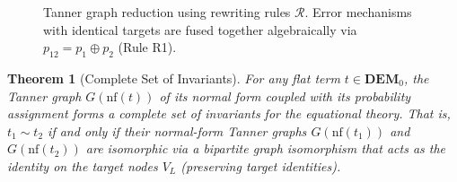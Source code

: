 \documentclass[11pt,a4paper]{article}
\newtheorem{theorem}{Theorem}
\newcommand{\nf}[1]{\mathrm{nf}(#1)}  %
\newcommand{\xorfold}{\oplus}          %
\begin{document}
  \begin{figure}[ht]
  \centering
  \caption{Tanner graph reduction using rewriting rules $\mathcal{R}$. Error mechanisms with identical targets are fused together algebraically via $p_{12} = p_1 \xorfold p_2$ (Rule R1).}
  \label{fig:tanner_reduction}
  \end{figure}
\begin{theorem}[Complete Set of Invariants]
\label{thm:invariants}
For any flat term $t \in \mathbf{DEM}_0$, the Tanner graph $G(\nf{t})$ of its normal form coupled with its probability assignment forms a complete set of invariants for the equational theory. That is, $t_1 \sim t_2$ if and only if their normal-form Tanner graphs $G(\nf{t_1})$ and $G(\nf{t_2})$ are isomorphic via a bipartite graph isomorphism that acts as the identity on the target nodes $V_L$ (preserving target identities).
\end{theorem}
\end{document}
